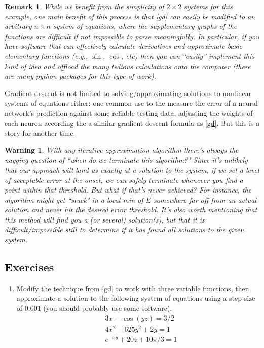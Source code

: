 \documentclass[12pt]{article}
\numberwithin{equation}{subsection}
\numberwithin{figure}{subsection}
\theoremstyle{note}
\newtheorem{remark}[subsection]{Remark}
\newtheorem{warning}[subsection]{Warning}
\begin{document}
{\begin{remark}While we benefit from the simplicity of $2\times 2$ systems for this example, one main benefit of this process is that \eqref{gd} can easily be modified to an arbitrary $n \times n$ system of equations, where the supplementary graphs of the functions are difficult if not impossible to parse meaningfully. In particular, if you have software that can effectively calculate derivatives and approximate basic elementary functions (e.g., $\sin$, $\cos$, etc) then you can ``easily'' implement this kind of idea and offload the many tedious calculations onto the computer (there are many python packages for this type of work).\end{remark}

Gradient descent is not limited to solving/approximating solutions to nonlinear systems of equations either: one common use to the measure the error of a neural network's prediction against some reliable testing data, adjusting the weights of each neuron according the a similar gradient descent formula as \eqref{gd}. But this is a story for another time.

\begin{warning}With any iterative approximation algorithm there's always the nagging question of ``when do we terminate this algorithm?" Since it's unlikely that our approach will land us \textit{exactly} at a solution to the system, if we set a level of acceptable error at the onset, we can safely terminate whenever you find a point within that threshold. But what if that's never achieved? For instance, the algorithm might get ``stuck" in a local min of $E$ somewhere far off from an actual solution and never hit the desired error threshold. It's also worth mentioning that this method will find you \textit{a} (or several) solution(s), but that it is difficult/impossible still to determine if it has found \textit{all} solutions to the given system.\end{warning}

\subsection{Exercises}
\begin{enumerate}[label=\arabic*.]

\item Modify the technique from \eqref{gd} to work with three variable functions, then approximate a solution to the following system of equations using a step size of $0.001$ (you should probably use some software).  \begin{align*}
	&3x-\cos(yz)=3/2 \\
	&4x^2-625y^2 +2y=1\\
	&e^{-xy}+20z+10\pi/3=1
\end{align*}


\end{enumerate}}
\end{document}
